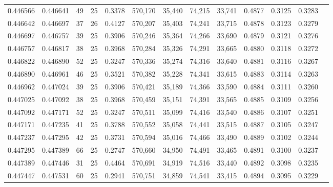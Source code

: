 \begin{tabular}{rrrrrrrrrrrrr}
0.446566 & 0.446641 &    49 &  25 &                                     0.3378 & 570,170 &  35,440 &  74,215 &  33,741 & 0.4877 & 0.3125 & 0.3283 \\
0.446642 & 0.446697 &    37 &  26 &                                     0.4127 & 570,207 &  35,403 &  74,241 &  33,715 & 0.4878 & 0.3123 & 0.3279 \\
0.446697 & 0.446757 &    39 &  25 &                                     0.3906 & 570,246 &  35,364 &  74,266 &  33,690 & 0.4879 & 0.3121 & 0.3276 \\
0.446757 & 0.446817 &    38 &  25 &                                     0.3968 & 570,284 &  35,326 &  74,291 &  33,665 & 0.4880 & 0.3118 & 0.3272 \\
0.446822 & 0.446890 &    52 &  25 &                                     0.3247 & 570,336 &  35,274 &  74,316 &  33,640 & 0.4881 & 0.3116 & 0.3267 \\
0.446890 & 0.446961 &    46 &  25 &                                     0.3521 & 570,382 &  35,228 &  74,341 &  33,615 & 0.4883 & 0.3114 & 0.3263 \\
0.446962 & 0.447024 &    39 &  25 &                                     0.3906 & 570,421 &  35,189 &  74,366 &  33,590 & 0.4884 & 0.3111 & 0.3260 \\
0.447025 & 0.447092 &    38 &  25 &                                     0.3968 & 570,459 &  35,151 &  74,391 &  33,565 & 0.4885 & 0.3109 & 0.3256 \\
0.447092 & 0.447171 &    52 &  25 &                                     0.3247 & 570,511 &  35,099 &  74,416 &  33,540 & 0.4886 & 0.3107 & 0.3251 \\
0.447171 & 0.447235 &    41 &  25 &                                     0.3788 & 570,552 &  35,058 &  74,441 &  33,515 & 0.4887 & 0.3105 & 0.3247 \\
0.447237 & 0.447295 &    42 &  25 &                                     0.3731 & 570,594 &  35,016 &  74,466 &  33,490 & 0.4889 & 0.3102 & 0.3244 \\
0.447295 & 0.447389 &    66 &  25 &                                     0.2747 & 570,660 &  34,950 &  74,491 &  33,465 & 0.4891 & 0.3100 & 0.3237 \\
0.447389 & 0.447446 &    31 &  25 &                                     0.4464 & 570,691 &  34,919 &  74,516 &  33,440 & 0.4892 & 0.3098 & 0.3235 \\
0.447447 & 0.447531 &    60 &  25 &                                     0.2941 & 570,751 &  34,859 &  74,541 &  33,415 & 0.4894 & 0.3095 & 0.3229 \\

\end{tabular}
